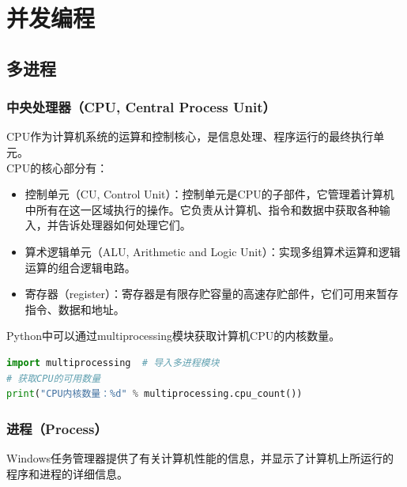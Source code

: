 \chapter{并发编程}

\section{多进程}

\subsection{中央处理器（CPU, Central Process Unit）}

CPU作为计算机系统的运算和控制核心，是信息处理、程序运行的最终执行单元。\\

CPU的核心部分有：

\begin{itemize}
	\item 控制单元（CU, Control Unit）：控制单元是CPU的子部件，它管理着计算机中所有在这一区域执行的操作。它负责从计算机、指令和数据中获取各种输入，并告诉处理器如何处理它们。

	\item 算术逻辑单元（ALU, Arithmetic and Logic Unit）：实现多组算术运算和逻辑运算的组合逻辑电路。

	\item 寄存器（register）：寄存器是有限存贮容量的高速存贮部件，它们可用来暂存指令、数据和地址。
\end{itemize}

Python中可以通过multiprocessing模块获取计算机CPU的内核数量。\\


\begin{lstlisting}[language=Python]
import multiprocessing	# 导入多进程模块
# 获取CPU的可用数量
print("CPU内核数量：%d" % multiprocessing.cpu_count())
\end{lstlisting}

\vspace{0.5cm}

\subsection{进程（Process）}

Windows任务管理器提供了有关计算机性能的信息，并显示了计算机上所运行的程序和进程的详细信息。\\

